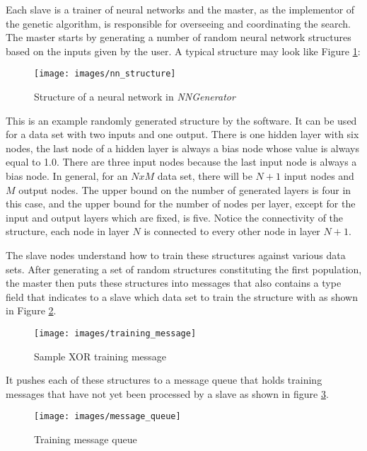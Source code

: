 Each slave is a trainer of neural networks and the master, as the implementor of the genetic algorithm, is responsible for overseeing and coordinating the search.
The master starts by generating a number of random neural network structures based on the inputs given by the user.
A typical structure may look like Figure \ref{nn_structure}:

\begin{figure}[h!]
  \centering
  \texttt{[image: images/nn\_structure]}
  \caption{Structure of a neural network in {\it NNGenerator}}
  \label{nn_structure}
\end{figure}

This is an example randomly generated structure by the software.
It can be used for a data set with two inputs and one output.
There is one hidden layer with six nodes, the last node of a hidden layer is always a bias node whose value is always equal to 1.0.
There are three input nodes because the last input node is always a bias node.
In general, for an $N x M$ data set, there will be $N + 1$ input nodes and $M$ output nodes.
The upper bound on the number of generated layers is four in this case, and the upper bound for the number of nodes per layer, except for the input and output layers which are fixed, is five.
Notice the connectivity of the structure, each node in layer $N$ is connected to every other node in layer $N+1$.  

The slave nodes understand how to train these structures against various data sets.
After generating a set of random structures constituting the first
population, the master then puts these structures into messages that
also contains a type field that indicates to a slave which data set to
train the structure with as shown in Figure \ref{training_message}.

\begin{figure}[h!]
  \centering
  \texttt{[image: images/training\_message]}
  \caption{Sample XOR training message}
  \label{training_message}
\end{figure}

It pushes each of these structures to a message queue that holds training messages that have not yet been processed by a slave as shown in figure \ref{message_queue}.

\begin{figure}[h!]
  \centering
  \texttt{[image: images/message\_queue]}
  \caption{Training message queue}
  \label{message_queue}
\end{figure}

